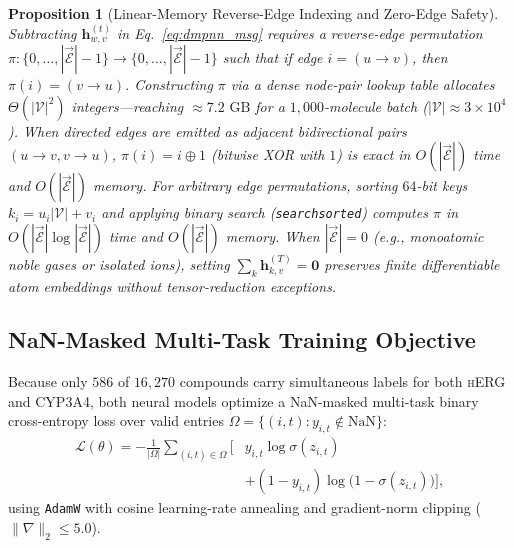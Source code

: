 \documentclass[10pt,twocolumn,letterpaper]{article}
\newtheorem{proposition}{Proposition}
\begin{document}
\begin{proposition}[Linear-Memory Reverse-Edge Indexing and Zero-Edge Safety]
  Subtracting $\mathbf{h}_{w,v}^{(t)}$ in Eq.~\eqref{eq:dmpnn_msg} requires a reverse-edge permutation $\pi : \{0,\dots,|\vec{\mathcal{E}}|-1\} \to \{0,\dots,|\vec{\mathcal{E}}|-1\}$ such that if edge $i = (u\!\to\!v)$, then $\pi(i) = (v\!\to\!u)$. Constructing $\pi$ via a dense node-pair lookup table allocates $\Theta(|\mathcal{V}|^2)$ integers—reaching $\approx 7.2\text{ GB}$ for a $1{,}000$-molecule batch ($|\mathcal{V}| \approx 3\times 10^4$). When directed edges are emitted as adjacent bidirectional pairs $(u\!\to\!v, v\!\to\!u)$, $\pi(i) = i \oplus 1$ (bitwise XOR with $1$) is exact in $O(|\vec{\mathcal{E}}|)$ time and $O(|\vec{\mathcal{E}}|)$ memory. For arbitrary edge permutations, sorting $64$-bit keys $k_i = u_i |\mathcal{V}| + v_i$ and applying binary search (\texttt{searchsorted}) computes $\pi$ in $O(|\vec{\mathcal{E}}|\log|\vec{\mathcal{E}}|)$ time and $O(|\vec{\mathcal{E}}|)$ memory. When $|\vec{\mathcal{E}}| = 0$ (e.g., monoatomic noble gases or isolated ions), setting $\sum_{k}\mathbf{h}_{k,v}^{(T)} = \mathbf{0}$ preserves finite differentiable atom embeddings without tensor-reduction exceptions.
\end{proposition}

\subsection{NaN-Masked Multi-Task Training Objective}
Because only $586$ of $16{,}270$ compounds carry simultaneous labels for both \textsc{hERG} and \textsc{CYP3A4}, both neural models optimize a NaN-masked multi-task binary cross-entropy loss over valid entries $\Omega = \{(i,t) : y_{i,t} \notin \mathrm{NaN}\}$:
\begin{equation}
\begin{aligned}
  \mathcal{L}(\theta) = -\frac{1}{|\Omega|} \sum_{(i,t)\in\Omega} \Big[ & y_{i,t}\log\sigma(z_{i,t}) \\
  & + (1-y_{i,t})\log\!\big(1-\sigma(z_{i,t})\big) \Big],
\end{aligned}
\end{equation}
using \texttt{AdamW} with cosine learning-rate annealing and gradient-norm clipping ($\|\nabla\|_2 \le 5.0$).
\end{document}
